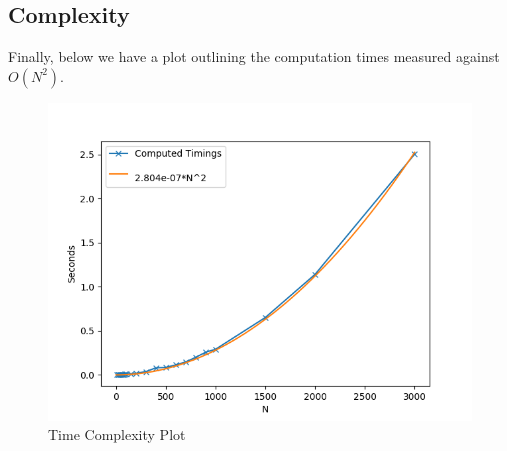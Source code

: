 \subsection{Complexity}
Finally, below we have a plot outlining the computation times measured against $O(N^{2})$.
\begin{figure}[htb]
  \begin{center}
    \includegraphics[width=14cm]{../images/time_complexity.png}
    \caption{Time Complexity Plot}
  \end{center}
\end{figure}
